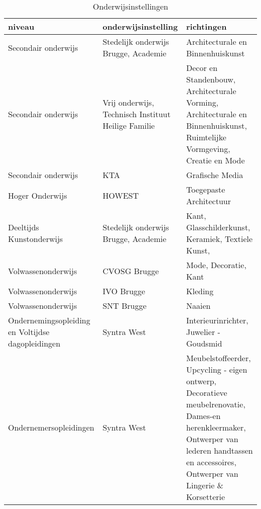 \begin{longtabu} to \textwidth {XXX}
\caption{Onderwijsinstellingen}\label{table:makers-onderwijs}\\ \hline
\textbf{niveau} & \textbf{onderwijsinstelling} & \textbf{richtingen} \\ \hline
Secondair onderwijs & Stedelijk onderwijs Brugge, Academie & Architecturale en Binnenhuiskunst \\ \hline
Secondair onderwijs & Vrij onderwijs, Technisch Instituut Heilige Familie & Decor en Standenbouw,  Architecturale Vorming, Architecturale en Binnenhuiskunst, Ruimtelijke Vormgeving, Creatie en Mode \\ \hline
Secondair onderwijs & KTA & Grafische Media \\ \hline
Hoger Onderwijs & HOWEST & Toegepaste Architectuur \\ \hline
Deeltijds Kunstonderwijs & Stedelijk onderwijs Brugge, Academie & Kant, Glasschilderkunst, Keramiek, Textiele Kunst, \\ \hline
Volwassenonderwijs & CVOSG Brugge & Mode, Decoratie, Kant \\ \hline
Volwassenonderwijs & IVO Brugge & Kleding \\ \hline
Volwassenonderwijs & SNT Brugge & Naaien \\ \hline
Ondernemingsopleiding en Voltijdse dagopleidingen & Syntra West & Interieurinrichter, Juwelier - Goudsmid \\ \hline
Ondernemersopleidingen & Syntra West & Meubelstoffeerder, Upcycling - eigen ontwerp, Decoratieve meubelrenovatie,  Dames-en herenkleermaker, Ontwerper van lederen handtassen en accessoires, Ontwerper van Lingerie \& Korsetterie
\end{longtabu}



